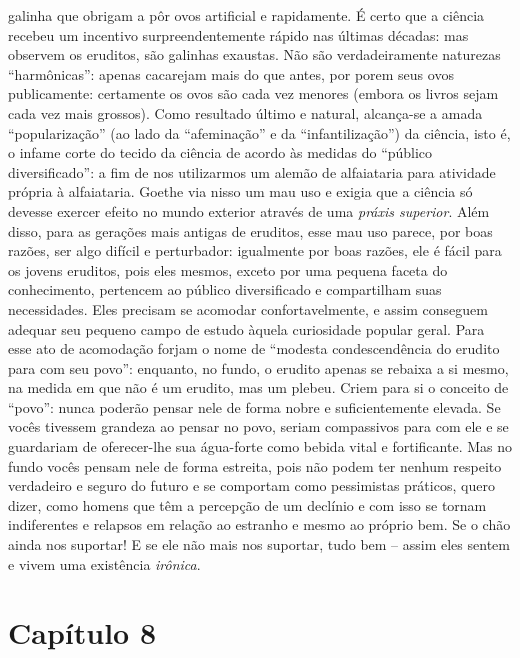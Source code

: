 galinha que obrigam a pôr ovos artificial e rapidamente. É certo que a
ciência recebeu um incentivo surpreendentemente rápido nas últimas
décadas: mas observem os eruditos, são galinhas exaustas. Não são
verdadeiramente naturezas ``harmônicas'': apenas cacarejam mais do que
antes, por porem seus ovos publicamente: certamente os ovos são cada vez
menores (embora os livros sejam cada vez mais grossos). Como resultado
último e natural, alcança-se a amada ``popularização'' (ao lado da
``afeminação'' e da ``infantilização'') da ciência, isto é, o infame
corte do tecido da ciência de acordo às medidas do ``público
diversificado'': a fim de nos utilizarmos um alemão de alfaiataria para
atividade própria à alfaiataria. Goethe via nisso um mau uso e exigia
que a ciência só devesse exercer efeito no mundo exterior através de uma
\emph{práxis superior}. Além disso, para as gerações mais antigas de
eruditos, esse mau uso parece, por boas razões, ser algo difícil e
perturbador: igualmente por boas razões, ele é fácil para os jovens
eruditos, pois eles mesmos, exceto por uma pequena faceta do
conhecimento, pertencem ao público diversificado e compartilham suas
necessidades. Eles precisam se acomodar confortavelmente, e assim
conseguem adequar seu pequeno campo de estudo àquela curiosidade popular
geral. Para esse ato de acomodação forjam o nome de ``modesta
condescendência do erudito para com seu povo'': enquanto, no fundo, o
erudito apenas se rebaixa a si mesmo, na medida em que não é um erudito,
mas um plebeu. Criem para si o conceito de ``povo'': nunca poderão
pensar nele de forma nobre e suficientemente elevada. Se vocês tivessem
grandeza ao pensar no povo, seriam compassivos para com ele e se
guardariam de oferecer-lhe sua água-forte como bebida vital e
fortificante. Mas no fundo vocês pensam nele de forma estreita, pois não
podem ter nenhum respeito verdadeiro e seguro do futuro e se comportam
como pessimistas práticos, quero dizer, como homens que têm a percepção
de um declínio e com isso se tornam indiferentes e relapsos em relação
ao estranho e mesmo ao próprio bem. Se o chão ainda nos suportar! E se
ele não mais nos suportar, tudo bem -- assim eles sentem e vivem uma
existência \emph{irônica}.

\chapter{Capítulo 8}\label{capuxedtulo-8}

